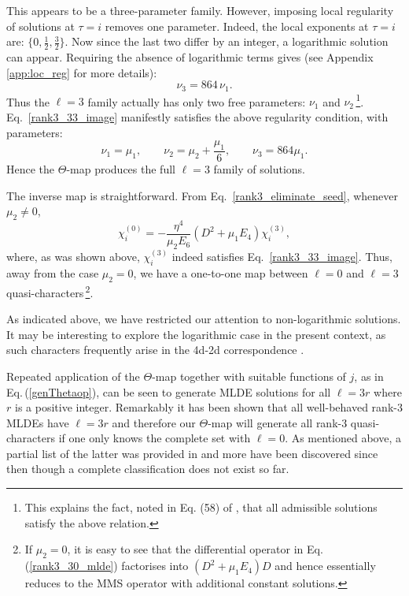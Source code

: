 \documentclass[11pt]{article}
\newcommand{\eref}[1]{Eq.\,(\ref{#1})}
\begin{document}
This appears to be a three-parameter
family. However, imposing local regularity of solutions at \(\tau=i\) removes one parameter. Indeed, the local exponents at \(\tau=i\) are: $\{0,\frac12,\frac32\}$. Now since the last two differ by an integer, a logarithmic solution can appear. Requiring the absence of logarithmic terms gives (see Appendix \ref{app:loc_reg} for more details):
\begin{equation}
    {\nu}_3=864\,\nu_1 .
    \label{rank3_nolog_condition}
\end{equation}
Thus the \(\ell=3\) family actually has only two free parameters:
\(\nu_1\) and \(\nu_2\)\,\footnote{This explains the fact, noted in Eq. (58) of \cite{Gowdigere:2023xnm}, that all admissible solutions satisfy the above relation.}. Eq.~\eqref{rank3_33_image} manifestly satisfies the above regularity condition, with parameters:
\begin{equation}
\nu_1=\mu_1,\qquad
    \nu_2=\mu_2+\frac{\mu_1}{6},
    \qquad
    \nu_3=864\mu_1 .
    \label{rank3_image_parameters}
\end{equation}
Hence the $\Theta$-map produces the full \(\ell=3\) family of solutions.

The inverse map is straightforward. From Eq.~\eqref{rank3_eliminate_seed}, whenever
\(\mu_2\neq0\),
\begin{equation}
    \chi_i^{(0)}
    =
    -\frac{\eta^4}{\mu_2 E_6}
    \left(
        D^2
        +
        \mu_1 E_4
    \right)\chi_i^{(3)} ,
    \label{rank3_inverse_AB}
\end{equation}
where, as was shown above, $\chi_i^{(3)}$ indeed satisfies Eq.~\eqref{rank3_33_image}. Thus, away from the case $\mu_2=0$, we have a one-to-one map between $\ell=0$ and $\ell=3$ quasi-characters\,\footnote{If \(\mu_2=0\), it is easy to see that the differential operator in \eref{rank3_30_mlde} factorises into $(D^2+\mu_1 E_4)D$ and hence essentially reduces to the MMS operator with additional constant solutions.}.

As indicated above, we have restricted our attention to non-logarithmic solutions. It may be interesting to explore the logarithmic case in the present context, as such characters frequently arise in the 4d-2d correspondence \cite{Beem:2017ooy}.

Repeated application of the $\Theta$-map together with suitable functions of $j$, as in \eref{genThetaop}, can be seen to generate MLDE solutions for all $\ell=3r$ where $r$ is a positive integer. Remarkably it has been shown \cite{Kaidi:2021ent} that all well-behaved rank-3 MLDEs have $\ell=3r$ and therefore our $\Theta$-map will generate all rank-3 quasi-characters if one only knows the complete set with $\ell=0$. As mentioned above, a partial list of the latter was provided in \cite{Mukhi:2020gnj} and more have been discovered since then \cite{Gowdigere:2023xnm, Rayhaun:2023pgc, Govindarajan:2025rgh, Govindarajan:2025jlq, DasMukhi:unpub} though a complete classification does not exist so far.
\end{document}
